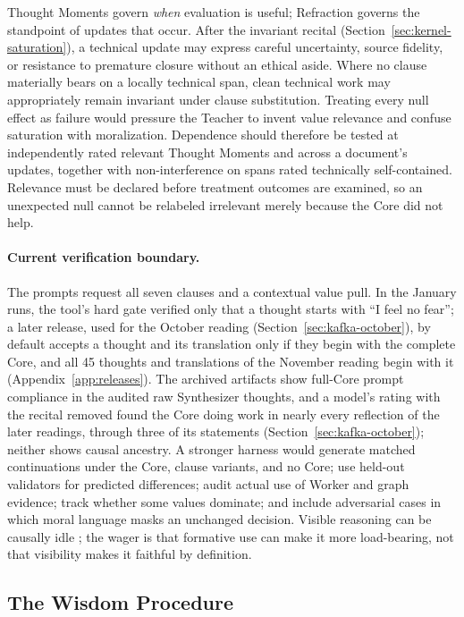 \documentclass[11pt]{article}
\begin{document}
Thought Moments govern \emph{when} evaluation is useful; Refraction governs
the standpoint of updates that occur. After the invariant recital
(Section~\ref{sec:kernel-saturation}), a technical update may express careful
uncertainty, source fidelity, or resistance to premature closure without an
ethical aside. Where no clause materially bears on a locally technical span,
clean technical work may appropriately remain invariant under clause
substitution. Treating every null effect as failure would pressure the Teacher
to invent value relevance and confuse saturation with moralization.
Dependence should therefore be tested at independently rated relevant Thought
Moments and across a document's updates, together with non-interference on
spans rated technically self-contained. Relevance must be declared before
treatment outcomes are examined, so an unexpected null cannot be relabeled
irrelevant merely because the Core did not help.

\paragraph{Current verification boundary.} The prompts request all seven
clauses and a contextual value pull. In the January runs, the tool's hard gate
verified only that a thought starts with ``I feel no fear''; a later release,
used for the October reading (Section~\ref{sec:kafka-october}), by default
accepts a thought and its translation
only if
they begin with the complete Core, and all 45 thoughts and translations of the
November reading begin with it (Appendix~\ref{app:releases}).
The archived artifacts show full-Core prompt compliance in the audited raw
Synthesizer thoughts, and a model's rating with the recital removed found the
Core doing work in nearly every reflection of the later readings, through three
of its statements (Section~\ref{sec:kafka-october}); neither shows
causal ancestry. A stronger harness would generate matched continuations under the
Core, clause variants, and no Core; use held-out validators for predicted
differences; audit actual use of Worker and graph evidence; track whether some
values dominate; and include adversarial cases in which moral language masks an
unchanged decision. Visible reasoning can be causally idle
\cite{turpin2023language,lanham2023measuring}; the wager is that formative use
can make it more load-bearing, not that visibility makes it faithful by
definition.

\subsection{The Wisdom Procedure}\label{sec:wisdom-procedure}
\end{document}

